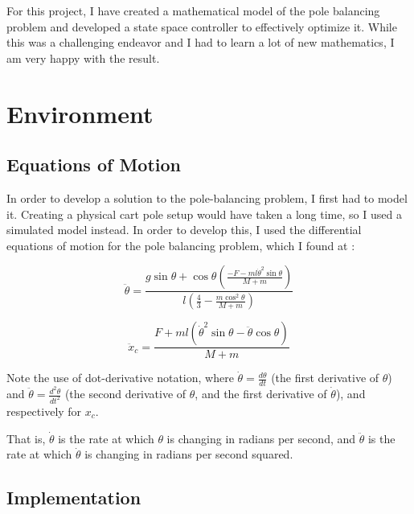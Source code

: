 \documentclass[11pt]{article}
\begin{document}
For this project, I have created a mathematical model of the pole balancing problem and developed a state space controller to effectively optimize it. While this was a challenging endeavor and I had to learn a lot of new mathematics, I am very happy with the result.

\section{Environment}

\subsection{Equations of Motion} \label{equations}

In order to develop a solution to the pole-balancing problem, I first had to model it. Creating a physical cart pole setup would have taken a long time, so I used a simulated model instead. In order to develop this, I used the differential equations of motion for the pole balancing problem, which I found at \cite{polebalancing}:

\begin{equation}
    \ddot \theta = \frac{\displaystyle g \sin \theta + \cos \theta \left( \frac{\displaystyle -F - m l \dot \theta ^2 \sin \theta}{\displaystyle M + m} \right)}{\displaystyle l \left( \frac{\displaystyle 4}{\displaystyle 3} - \frac{\displaystyle m \cos ^2 \theta}{\displaystyle M + m} \right)}
\end{equation}

\begin{equation}
    \ddot x _c = \frac{\displaystyle F + m l \left( \dot \theta ^2 \sin \theta - \ddot \theta \cos \theta \right)}{\displaystyle M + m}
\end{equation}

Note the use of dot-derivative notation, where $\displaystyle \dot \theta = \frac{\displaystyle d \theta}{\displaystyle d t}$ (the first derivative of $\theta$) and $\displaystyle \ddot \theta = \frac{\displaystyle d ^2 \theta}{\displaystyle d t ^2}$ (the second derivative of $\theta$, and the first derivative of $\dot \theta$), and respectively for $x _c$.

That is, $\dot \theta$ is the rate at which $\theta$ is changing in radians per second, and $\ddot \theta$ is the rate at which $\dot \theta$ is changing in radians per second squared.

\subsection{Implementation}
\end{document}
